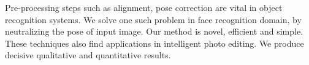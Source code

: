 Pre-processing steps such as alignment, pose correction are vital in object recognition systems. We
solve one such problem in face recognition domain, by neutralizing the pose of input image. Our method is novel, efficient and simple. These techniques also find applications in intelligent photo editing. We produce decisive qualitative and quantitative results.

